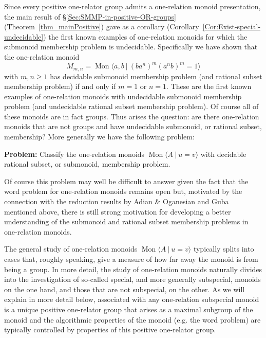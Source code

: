 \documentclass{amsart}
\newcommand{\Mpres}[2]{\operatorname{Mon}\bigl\langle #1\:|\:#2 \bigr\rangle}
\theoremstyle{plain}
\theoremstyle{definition}
\begin{document}
Since every positive one-relator group admits a one-relation monoid presentation, the main result of \S\ref{Sec:SMMP-in-positive-OR-groups} (Theorem~\ref{thm_mainPositive}) gave as a corollary (Corollary~\ref{Cor:Exist-special-undecidable}) the first known examples of one-relation monoids for which the submonoid membership problem is undecidable. Specifically we have shown that the one-relation monoid  
\[
M_{m,n} = \Mpres{a,b}{(b a^n)^m(a^n b)^m = 1}
\]
with $m, n \geq 1$  has decidable submonoid membership problem (and rational subset membership problem) if and only if $m=1$ or $n=1$. These are the first known examples of one-relation monoids with undecidable submonoid membership problem (and undecidable rational subset membership problem). Of course all of these monoids are in fact groups. Thus arises the question: are there one-relation monoids that are not groups and have undecidable submonoid, or rational subset, membership? More generally we have the following problem:  

\smallskip

\noindent \textbf{Problem:}
Classify the one-relation monoids $\Mpres{A}{u=v}$ with decidable rational subset, or submonoid, membership problem.

\smallskip

Of course this problem may well be difficult to answer given the fact that the word problem for one-relation monoids remains open but, motivated by the connection with the reduction results by Adian \& Oganesian and Guba mentioned above, there is still strong motivation for developing a better understanding of the submonoid and rational subset membership problems in one-relation monoids.  

The general study of one-relation monoids $\Mpres{A}{u=v}$ typically splits into cases that, roughly speaking, give a measure of how far away the monoid is from being a group. In more detail, the study of one-relation monoids naturally divides into the investigation of so-called special, and more generally subspecial, monoids on the one hand, and those that are not subspecial, on the other. As we will explain in more detail below, associated with any one-relation subspecial monoid is a unique positive one-relator group that arises as a maximal subgroup of the monoid and the algorithmic properties of the monoid (e.g. the word problem) are typically controlled by properties of this positive one-relator group. 
\end{document}
